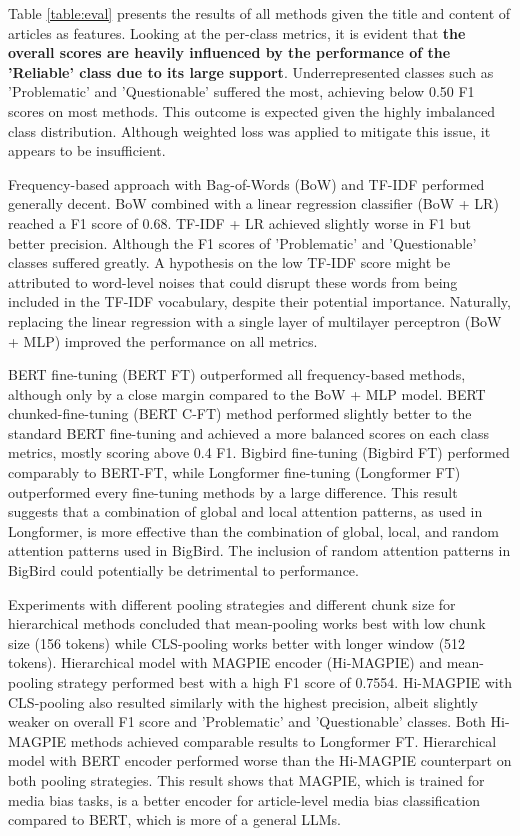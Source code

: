 Table \ref{table:eval} presents the results of all methods given the title and content of articles as features. Looking at the per-class metrics, it is evident that \textbf{the overall scores are heavily influenced by the performance of the 'Reliable' class due to its large support}. Underrepresented classes such as 'Problematic' and 'Questionable' suffered the most, achieving below 0.50 F1 scores on most methods. This outcome is expected given the highly imbalanced class distribution. Although weighted loss was applied to mitigate this issue, it appears to be insufficient.

Frequency-based approach with Bag-of-Words (BoW) and TF-IDF performed generally decent. BoW combined with a linear regression classifier (BoW + LR) reached a F1 score of 0.68. TF-IDF + LR achieved slightly worse in F1 but better precision. Although the F1 scores of 'Problematic' and 'Questionable' classes suffered greatly. A hypothesis on the low TF-IDF score might be attributed to word-level noises that could disrupt these words from being included in the TF-IDF vocabulary, despite their potential importance. Naturally, replacing the linear regression with a single layer of multilayer perceptron (BoW + MLP) improved the performance on all metrics.

BERT fine-tuning (BERT FT) outperformed all frequency-based methods, although only by a close margin compared to the BoW + MLP model. BERT chunked-fine-tuning (BERT C-FT) method performed slightly better to the standard BERT fine-tuning and achieved a more balanced scores on each class metrics, mostly scoring above 0.4 F1. Bigbird fine-tuning (Bigbird FT) performed comparably to BERT-FT, while Longformer fine-tuning (Longformer FT) outperformed every fine-tuning methods by a large difference. This result suggests that a combination of global and local attention patterns, as used in Longformer, is more effective than the combination of global, local, and random attention patterns used in BigBird. The inclusion of random attention patterns in BigBird could potentially be detrimental to performance.

Experiments with different pooling strategies and different chunk size for hierarchical methods concluded that mean-pooling works best with low chunk size (156 tokens) while CLS-pooling works better with longer window (512 tokens). Hierarchical model with MAGPIE encoder (Hi-MAGPIE) and mean-pooling strategy performed best with a high F1 score of 0.7554. Hi-MAGPIE with CLS-pooling also resulted similarly with the highest precision, albeit slightly weaker on overall F1 score and 'Problematic' and 'Questionable' classes. Both Hi-MAGPIE methods achieved comparable results to Longformer FT. Hierarchical model with BERT encoder performed worse than the Hi-MAGPIE counterpart on both pooling strategies. This result shows that MAGPIE, which is trained for media bias tasks, is a better encoder for article-level media bias classification compared to BERT, which is more of a general LLMs.



